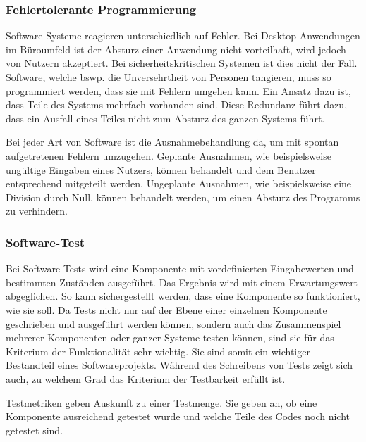 \subsubsection{Fehlertolerante Programmierung}
Software-Systeme reagieren unterschiedlich auf Fehler.
Bei Desktop Anwendungen im Büroumfeld ist der Absturz einer Anwendung nicht vorteilhaft, wird jedoch von Nutzern akzeptiert.
Bei sicherheitskritischen Systemen ist dies nicht der Fall.
Software, welche bswp. die Unversehrtheit von Personen tangieren, muss so programmiert werden, dass sie mit Fehlern umgehen kann.
Ein Ansatz dazu ist, dass Teile des Systems mehrfach vorhanden sind.
Diese Redundanz führt dazu, dass ein Ausfall eines Teiles nicht zum Absturz des ganzen Systems führt.

Bei jeder Art von Software ist die Ausnahmebehandlung da, um mit spontan aufgetretenen Fehlern umzugehen.
Geplante Ausnahmen, wie beispielsweise ungültige Eingaben eines Nutzers, können behandelt und dem Benutzer entsprechend mitgeteilt werden.
Ungeplante Ausnahmen, wie beispielsweise eine Division durch Null, können behandelt werden, um einen Absturz des Programms zu verhindern.


\subsubsection{Software-Test}\label{quality_test}
Bei Software-Tests wird eine Komponente mit vordefinierten Eingabewerten und bestimmten Zuständen ausgeführt.
Das Ergebnis wird mit einem Erwartungswert abgeglichen.
So kann sichergestellt werden, dass eine Komponente so funktioniert, wie sie soll.
Da Tests nicht nur auf der Ebene einer einzelnen Komponente geschrieben und ausgeführt werden können, sondern auch das Zusammenspiel mehrerer Komponenten oder ganzer Systeme testen können,
sind sie für das Kriterium der Funktionalität sehr wichtig.
Sie sind somit ein wichtiger Bestandteil eines Softwareprojekts.
Während des Schreibens von Tests zeigt sich auch, zu welchem Grad das Kriterium der Testbarkeit erfüllt ist.

Testmetriken geben Auskunft zu einer Testmenge.
Sie geben an, ob eine Komponente ausreichend getestet wurde und welche Teile des Codes noch nicht getestet sind.

